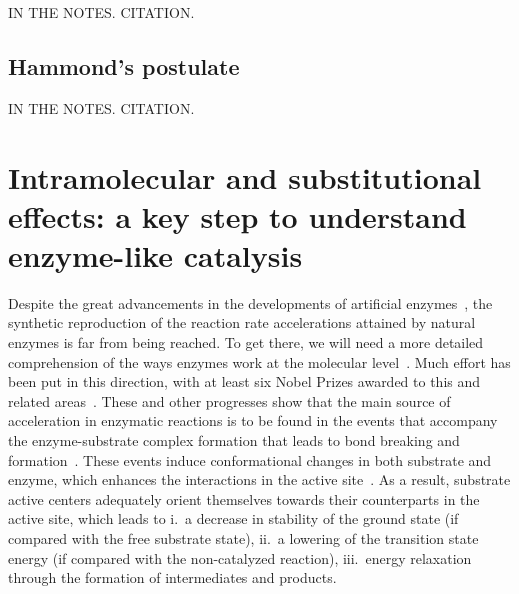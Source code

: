 IN THE NOTES.\@
CITATION.\@

\subsection{Hammond's postulate}

IN THE NOTES.\@
CITATION.\@




\section{Intramolecular and substitutional effects:
  a key step to understand enzyme-like catalysis}

Despite the great advancements in the developments of artificial enzymes~\cite{Breslow_1995},
the synthetic reproduction of the reaction rate accelerations attained by
natural enzymes is far from being reached.
To get there, we will need a more detailed comprehension of the ways enzymes
work at the molecular level~\cite{Catalysis_in_Chemistry_and_Enzymology}.
Much effort has been put in this direction, with at least six Nobel Prizes
awarded to this and related areas~\cite{Nobel_1929,Nobel_1946,Nobel_1957,Nobel_1975,Nobel_1997,Nobel_2013}.
These and other progresses show that the main source of acceleration in
enzymatic reactions is to be found in the events that accompany the
enzyme-substrate complex formation that leads to bond breaking and
formation~\cite{Catalysis_in_Chemistry_and_Enzymology}.
These events induce conformational changes in both substrate and enzyme, which
enhances the interactions in the active site~\cite{Fischer_1890,Fischer_1894,Koshland_1958,Dafforn_1971,Kirby_1996}.
As a result, substrate active centers adequately orient themselves towards
their counterparts in the active site, which leads to
i.\ a decrease in stability of the ground state (if compared with the
free substrate state),
ii.\ a lowering of the transition state energy (if compared with the
non-catalyzed reaction),
iii.\ energy relaxation through the formation of intermediates and
products.

